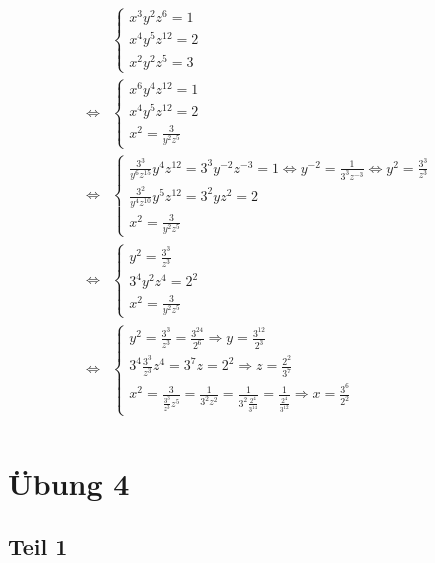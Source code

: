 \documentclass[a4paper,10pt]{article}
\begin{document}
\begin{align*}
 & \begin{cases}
  x^3 y^2 z^6 = 1\\
  x^4 y^5 z^{12} = 2\\
  x^2 y^2 z^5 = 3
 \end{cases}\\
 \Leftrightarrow & 
 \begin{cases}
  x^6 y^4 z^{12} = 1\\
  x^4 y^5 z^{12} = 2\\
  x^2 = \frac{3}{y^2 z^5}
 \end{cases}\\
 \Leftrightarrow & 
 \begin{cases}
  \frac{3^3}{y^6 z^{15}} y^4 z^{12} = 3^3 y^{-2} z^{-3} = 1 \Leftrightarrow y^{-2} = \frac{1}{3^3 z^{-3}} \Leftrightarrow y^2 = \frac{3^3}{z^3}\\
  \frac{3^2}{y^4 z^{10}} y^5 z^{12} = 3^2 y z^2 = 2\\
  x^2 = \frac{3}{y^2 z^5}
 \end{cases}\\
 \Leftrightarrow & 
 \begin{cases}
  y^2 = \frac{3^3}{z^3}\\
  3^4 y^2 z^4 = 2^2\\
  x^2 = \frac{3}{y^2 z^5}
 \end{cases}\\
 \Leftrightarrow & 
 \begin{cases}
  y^2 = \frac{3^3}{z^3} = \frac{3^{24}}{2^6} \Rightarrow y = \frac{3^{12}}{2^3}\\
  3^4 \frac{3^3}{z^3} z^4 = 3^7 z = 2^2 \Rightarrow z = \frac{2^2}{3^7}\\
  x^2 = \frac{3}{\frac{3^3}{z^3} z^5} = \frac{1}{3^2 z^2} = \frac{1}{3^2 \frac{2^4}{3^{14}}} = \frac{1}{\frac{2^4}{3^{12}}} \Rightarrow x = \frac{3^{6}}{2^2}
 \end{cases}\\
\end{align*}

\section*{Übung 4}

\subsection*{Teil 1}
\end{document}
